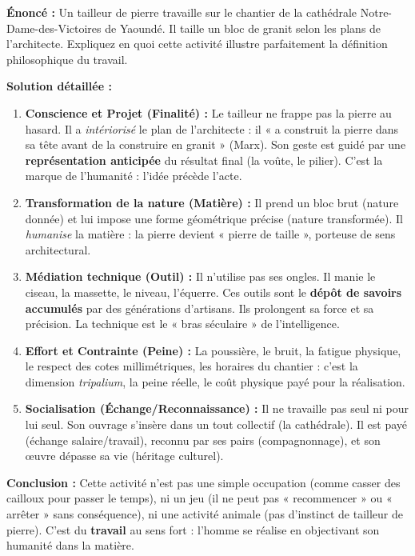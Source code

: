 \documentclass[11pt]{article}
\begin{document}
\begin{exoresolu}
\textbf{Énoncé :} Un tailleur de pierre travaille sur le chantier de la cathédrale Notre-Dame-des-Victoires de Yaoundé. Il taille un bloc de granit selon les plans de l'architecte. Expliquez en quoi cette activité illustre parfaitement la définition philosophique du travail.

\textbf{Solution détaillée :}
\begin{enumerate}
    \item \textbf{Conscience et Projet (Finalité) :} Le tailleur ne frappe pas la pierre au hasard. Il a \emph{intériorisé} le plan de l'architecte : il « a construit la pierre dans sa tête avant de la construire en granit » (Marx). Son geste est guidé par une \textbf{représentation anticipée} du résultat final (la voûte, le pilier). C'est la marque de l'humanité : l'idée précède l'acte.
    \item \textbf{Transformation de la nature (Matière) :} Il prend un bloc brut (nature donnée) et lui impose une forme géométrique précise (nature transformée). Il \emph{humanise} la matière : la pierre devient « pierre de taille », porteuse de sens architectural.
    \item \textbf{Médiation technique (Outil) :} Il n'utilise pas ses ongles. Il manie le ciseau, la massette, le niveau, l'équerre. Ces outils sont le \textbf{dépôt de savoirs accumulés} par des générations d'artisans. Ils prolongent sa force et sa précision. La technique est le « bras séculaire » de l'intelligence.
    \item \textbf{Effort et Contrainte (Peine) :} La poussière, le bruit, la fatigue physique, le respect des cotes millimétriques, les horaires du chantier : c'est la dimension \emph{tripalium}, la peine réelle, le coût physique payé pour la réalisation.
    \item \textbf{Socialisation (Échange/Reconnaissance) :} Il ne travaille pas seul ni pour lui seul. Son ouvrage s'insère dans un tout collectif (la cathédrale). Il est payé (échange salaire/travail), reconnu par ses pairs (compagnonnage), et son œuvre dépasse sa vie (héritage culturel).
\end{enumerate}
\textbf{Conclusion :} Cette activité n'est pas une simple occupation (comme casser des cailloux pour passer le temps), ni un jeu (il ne peut pas « recommencer » ou « arrêter » sans conséquence), ni une activité animale (pas d'instinct de tailleur de pierre). C'est du \textbf{travail} au sens fort : l'homme se réalise en objectivant son humanité dans la matière.
\end{exoresolu}
\end{document}
